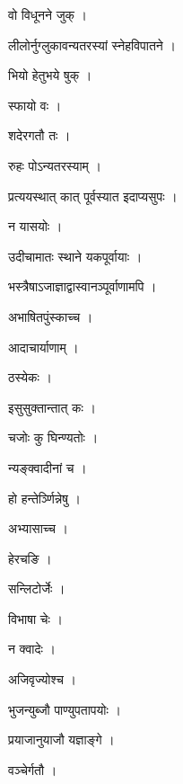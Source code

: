 \documentclass[10pt, openany]{book}
\begin{document}
\noindent वो विधूनने जुक् ।

\noindent लीलोर्नुग्लुकावन्यतरस्यां स्नेहविपातने ।

\noindent भियो हेतुभये षुक् ।

\noindent स्फायो वः ।

\noindent शदेरगतौ तः ।

\noindent रुहः पोऽन्यतरस्याम् ।

\noindent प्रत्ययस्थात् कात् पूर्वस्यात इदाप्यसुपः ।

\noindent न यासयोः ।

\noindent उदीचामातः स्थाने यकपूर्वायाः ।

\noindent भस्त्रैषाऽजाज्ञाद्वास्वानञ्पूर्वाणामपि ।

\noindent अभाषितपुंस्काच्च ।

\noindent आदाचार्याणाम् ।

\noindent ठस्येकः ।

\noindent इसुसुक्तान्तात् कः ।

\noindent चजोः कु घिन्ण्यतोः ।

\noindent न्यङ्क्वादीनां च ।

\noindent हो हन्तेर्ञ्णिन्नेषु ।

\noindent अभ्यासाच्च ।

\noindent हेरचङि ।

\noindent सन्लिटोर्जेः ।

\noindent विभाषा चेः ।

\noindent न क्वादेः ।

\noindent अजिवृज्योश्च ।

\noindent भुजन्युब्जौ पाण्युपतापयोः ।

\noindent प्रयाजानुयाजौ यज्ञाङ्गे ।

\noindent वञ्चेर्गतौ ।
\end{document}
